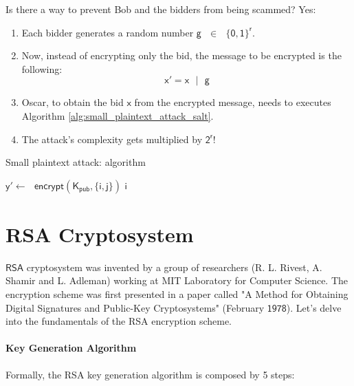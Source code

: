 \documentclass{article}
\begin{document}
Is there a way to prevent Bob and the bidders from being scammed? Yes:

\begin{enumerate}
    \item Each bidder generates a random number $\mathsf{g \text{ } \in \text{ } \{0,1\}^{r}}$.
    \item Now, instead of encrypting only the bid, the message to be encrypted is the following:
    $$
        \mathsf{x' = x \text{ } | \text{ } g}
    $$
    \item Oscar, to obtain the bid $\mathsf{x}$ from the encrypted message, needs to executes Algorithm \ref{alg:small_plaintext_attack_salt}.
    \item The attack's complexity gets multiplied by $\mathsf{2^r}$!
\end{enumerate}

\begin{algorithm}
    \caption{Small plaintext attack: algorithm}
    \label{alg:small_plaintext_attack_salt}
    \begin{algorithmic}
                \State $\mathsf{y' \gets \text{ } encrypt(K_{pub}, \{i, j\})}$
                    \Return $\mathsf{i}$
                \EndIf
            \EndFor
        \EndFor
    \end{algorithmic}
\end{algorithm}
\newpage
\section{RSA Cryptosystem}

\par \noindent $\mathsf{RSA}$ cryptosystem was invented by a group of researchers (R. L. Rivest, A. Shamir and L. Adleman) working at MIT Laboratory for Computer Science. The encryption scheme was first presented in a paper called "A Method for Obtaining Digital Signatures and Public-Key Cryptosystems" (February $\mathsf{1978}$). Let's delve into the fundamentals of the RSA encryption scheme.

\paragraph{Key Generation Algorithm} Formally, the RSA key generation algorithm is composed by 5 steps:
\end{document}
